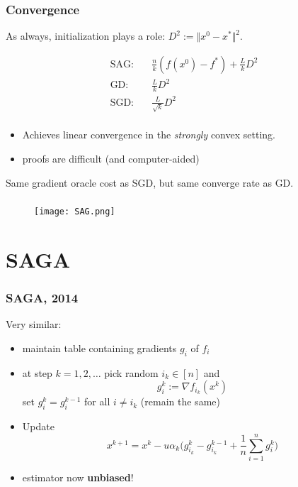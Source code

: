 \documentclass[aspectratio=149]{beamer}
\begin{document}
\begin{frame}
  \frametitle{Convergence}
  As always, initialization plays a role: $D^2 := \Vert x^0 -x^* \Vert^2$.

  \begin{equation}
    \begin{aligned}
      \text{SAG:}& \quad \frac{n}{k}(f(x^0)-f^*) + \frac{L}{k}D^2 \\
      \text{GD:}& \quad \frac{L}{k}D^2 \\
      \text{SGD:}& \quad \frac{L}{\sqrt{k}}D^2 \\
    \end{aligned}
  \end{equation}
  \begin{itemize}
    \item Achieves linear convergence in the \emph{strongly} convex setting.
    \item proofs are difficult (and computer-aided)
  \end{itemize}


  \begin{center}
    Same gradient oracle cost as SGD, but same converge rate as GD.
  \end{center}
\end{frame}

\begin{frame}
  \frametitle{}
  \begin{figure}[ht]
    \centering
    \texttt{[image: SAG.png]}
    \caption{\label{fig:label} }
  \end{figure}

\end{frame}


\section{SAGA}%
\label{sec:}

\begin{frame}
  \frametitle{SAGA, 2014}
  Very similar:
  \begin{itemize}
    \item maintain table containing gradients $g_i$ of $f_i$
    \item at step $k = 1,2, \dots$ pick random $i_k \in [n]$ and
          \begin{equation}
            g_i^k := \nabla f_{i_k}(x^{k})
          \end{equation}
          set $g_{i}^k = g_i^{k-1}$ for all $i\neq i_k$ (remain the same)
    \item Update
          \begin{equation}
            x^{k+1} = x^k -u \alpha_k  \Big( g_{i_k}^k - g_{i_k}^{k-1} + \frac{1}{n}\sum_{i=1}^{n} g_i^k \Big)
          \end{equation}
    \item estimator now \textbf{unbiased}!
  \end{itemize}
\end{frame}
\end{document}
